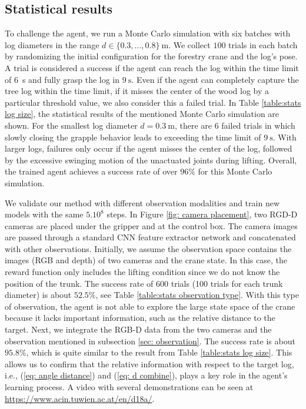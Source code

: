 \subsection{Statistical results}
\label{sec: stats MC}
To challenge the agent, we run a Monte Carlo simulation with six batches with log diameters in the range $d \in \{0.3,...,0.8\} \SI{}{\meter}$. We collect $100$ trials in each batch by randomizing the initial configuration for the forestry crane and the log's pose. 
A trial is considered a success if the agent can reach the log within the time limit of \SI{6}{\second} and fully grasp the log in $\SI{9}{\second}$. Even if the agent can completely capture the tree log within the time limit, if it misses the center of the wood log by a particular threshold value, we also consider this a failed trial. In Table \ref{table:stats log size}, the statistical results of the mentioned Monte Carlo simulation are shown. For the smallest log diameter $d = \SI{0.3}{\meter}$, there are $6$ failed trials in which slowly closing the grapple behavior leads to exceeding the time limit of $\SI{9}{\second}$. With larger logs, failures only occur if the agent misses the center of the log, followed by the excessive swinging motion of the unactuated joints during lifting. Overall, the trained agent achieves a success rate of over $96\%$  for this Monte Carlo simulation. 

\iffalse
    We validate our method with different observation modalities and train new models with the same $5.10^8$ steps. In Figure \ref{fig: camera placement}, two RGD-D cameras are placed under the gripper and at the control box. The camera images are passed through a standard CNN feature extractor network and concatenated with other observations. Initially, we assume the observation space contains the images (RGB and depth) of two cameras and the crane state. In this case, the reward function only includes the lifting condition since we do not know the position of the trunk. The success rate of 600 trials (100 trials for each trunk diameter) is about $52.5\%$, see Table \ref{table:stats observation type}. With this type of observation, the agent is not able to explore the large state space of the crane because it lacks important information, such as the relative distance to the target. Next, we integrate the RGB-D data from the two cameras and the observation mentioned in subsection \ref{sec: observation}. The success rate is about $95.8\%$, which is quite similar to the result from Table \ref{table:stats log size}. This allows us to confirm that the relative information with respect to the target log, i.e., (\ref{eq: angle distance}) and (\ref{eq: d combine}), plays a key role in the agent's learning process. A video with several demonstrations can be seen at \href{https://www.acin.tuwien.ac.at/en/d18a/}{https://www.acin.tuwien.ac.at/en/d18a/}. 
    
